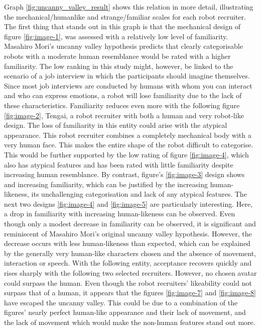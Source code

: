 Graph \ref{fig:uncanny_valley_result} shows this relation in more detail, illustrating the mechanical/humanlike and strange/familiar scales for each robot recruiter. The first thing that stands out in this graph is that the mechanical design of figure \ref{fig:image-1}, was assessed with a relatively low level of familiarity. Masahiro Mori's uncanny valley hypothesis predicts that clearly categorisable robots with a moderate human resemblance would be rated with a higher familiarity. The low ranking in this study might, however, be linked to the scenario of a job interview in which the participants should imagine themselves. Since most job interviews are conducted by humans with whom you can interact and who can express emotions, a robot will lose familiarity due to the lack of these characteristics. Familiarity reduces even more with the following figure \ref{fig:image-2}, Tengai, a robot recruiter with both a human and very robot-like design. The loss of familiarity in this entity could arise with the atypical appearance. This robot recruiter combines a completely mechanical body with a very human face. This makes the entire shape of the robot difficult to categorise. This would be further supported by the low rating of figure \ref{fig:image-4}, which also has atypical features and has been rated with little familiarity despite increasing human resemblance. By contrast, figure's \ref{fig:image-3} design shows and increasing familiarity, which can be justified by the increasing human-likeness, its unchallenging categorisation and lack of any atypical features. The next two designs \ref{fig:image-4} and \ref{fig:image-5} are particularly interesting. Here, a drop in familiarity with increasing human-likeness can be observed. Even though only a modest decrease in familiarity can be observed, it is significant and reminiscent of Masahiro Mori's original uncanny valley hypothesis. However, the decrease occurs with less human-likeness than expected, which can be explained by the generally very human-like characters chosen and the absence of movement, interaction or speech. With the following entity, acceptance recovers quickly and rises sharply with the following two selected recruiters. However, no chosen avatar could surpass the human. Even though the robot recruiters' likeability could not surpass that of a human, it appears that the figures \ref{fig:image-7} and \ref{fig:image-8} have escaped the uncanny valley. This could be due to a combination of the figures' nearly perfect human-like appearance and their lack of movement, and the lack of movement which would make the non-human features stand out more.\\
